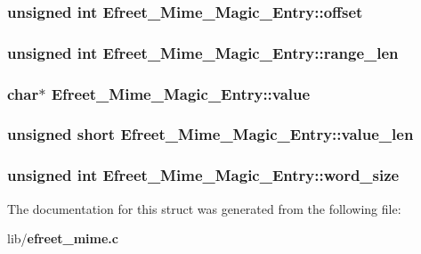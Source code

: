 \subsubsection[offset]{\setlength{\rightskip}{0pt plus 5cm}unsigned int {\bf Efreet\_\-Mime\_\-Magic\_\-Entry::offset}}\label{structEfreet__Mime__Magic__Entry_73aa16d088be4f2a3aa03c9ca5eaa618}


\subsubsection[range\_\-len]{\setlength{\rightskip}{0pt plus 5cm}unsigned int {\bf Efreet\_\-Mime\_\-Magic\_\-Entry::range\_\-len}}\label{structEfreet__Mime__Magic__Entry_00ba29bea2a45e9e10663c4b729e1cbe}


\subsubsection[value]{\setlength{\rightskip}{0pt plus 5cm}char$\ast$ {\bf Efreet\_\-Mime\_\-Magic\_\-Entry::value}}\label{structEfreet__Mime__Magic__Entry_69cb6675e1f792c9174085c8a3af7bc5}


\subsubsection[value\_\-len]{\setlength{\rightskip}{0pt plus 5cm}unsigned short {\bf Efreet\_\-Mime\_\-Magic\_\-Entry::value\_\-len}}\label{structEfreet__Mime__Magic__Entry_cbc13e36a4511eb1653eb08e37e0667b}


\subsubsection[word\_\-size]{\setlength{\rightskip}{0pt plus 5cm}unsigned int {\bf Efreet\_\-Mime\_\-Magic\_\-Entry::word\_\-size}}\label{structEfreet__Mime__Magic__Entry_d20d2adb1bc786b041190ee3794ff1ac}




The documentation for this struct was generated from the following file:\begin{CompactItemize}
\item 
lib/{\bf efreet\_\-mime.c}\end{CompactItemize}
